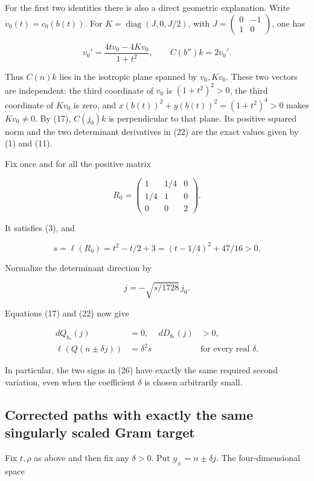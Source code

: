 \documentclass[11pt]{article}
\begin{document}
For the first two identities there is also a direct geometric explanation.
Write \(v_0(t)=c_0(b(t))\). For
\(K=\operatorname{diag}(J,0,J/2)\), with
\(J=\left(\begin{smallmatrix}0&-1\\1&0\end{smallmatrix}\right)\), one has

\[
v_0'=\frac{4t v_0-4Kv_0}{1+t^2},\qquad C(b'')k=2v_0'.
\tag{23}
\]

Thus \(C(n)k\) lies in the isotropic plane spanned by \(v_0,Kv_0\).
These two vectors are independent: the third coordinate of \(v_0\) is
\((1+t^2)^2>0\), the third coordinate of \(Kv_0\) is zero, and
\(x(b(t))^2+y(b(t))^2=(1+t^2)^4>0\) makes \(Kv_0\ne0\).
By (17), \(C(j_0)k\) is perpendicular to that plane. Its positive squared
norm and the two determinant derivatives in (22) are the exact values
given by (1) and (11).

Fix once and for all the positive matrix

\[
R_0=\begin{pmatrix}1&1/4&0\\1/4&1&0\\0&0&2\end{pmatrix}.
\tag{24}
\]

It satisfies (3), and

\[
s=\ell(R_0)=t^2-t/2+3=(t-1/4)^2+47/16>0.
\]

Normalize the determinant direction by

\[
j=-\sqrt{s/1728}\,j_0.
\tag{25}
\]

Equations (17) and (22) now give

\[
\begin{aligned}
dQ_{b_*}(j)&=0,&dD_{b_*}(j)&>0,\\
\ell(Q(n\pm\delta j))&=\delta^2s
&&\text{for every real }\delta.
\end{aligned}
\tag{26}
\]

In particular, the two signs in (26) have exactly the same required second
variation, even when the coefficient \(\delta\) is chosen arbitrarily small.

\subsection{Corrected paths with exactly the same singularly scaled Gram target}

Fix \(t,\rho\) as above and then fix any \(\delta>0\). Put
\(y_\pm=n\pm\delta j\). The four-dimensional space
\end{document}
